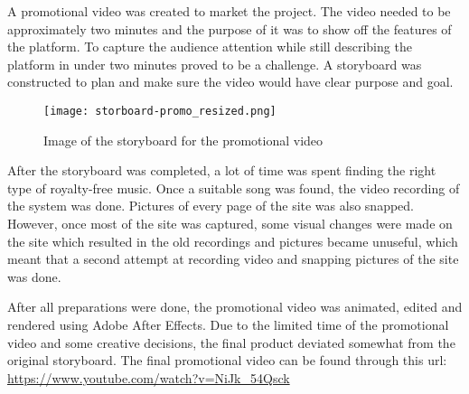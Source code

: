 A promotional video was created to market the project. The video needed to be approximately two minutes and the purpose of it was to show off the features of the platform.
To capture the audience attention while still describing the platform in under two minutes proved to be a challenge. A storyboard was constructed to plan and make sure the video would have clear purpose and goal.
\begin{figure}[h]
    \centering
    \texttt{[image: storboard-promo\_resized.png]}
    \caption{Image of the storyboard for the promotional video}
\end{figure}
After the storyboard was completed, a lot of time was spent finding the right type of royalty-free music. Once a suitable song was found, the video recording of the system was done. Pictures of every page of the site was also snapped. However, once most of the site was captured, some visual changes were made on the site which resulted in the old recordings and pictures became unuseful, which meant that a second attempt at recording video and snapping pictures of the site was done.

After all preparations were done, the promotional video was animated, edited and rendered using Adobe After Effects. Due to the limited time of the promotional video and some creative decisions, the final product deviated somewhat from the original storyboard. The final promotional video can be found through this url: \url{https://www.youtube.com/watch?v=NiJk_54Qsck}
